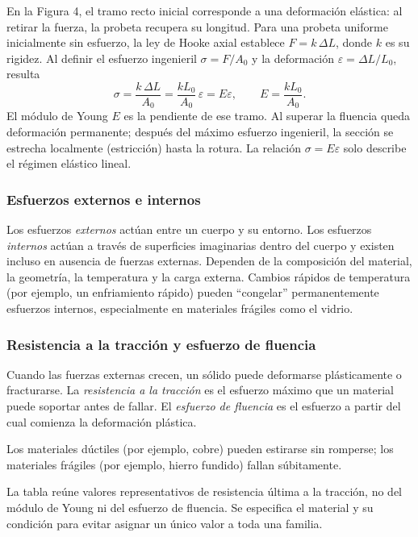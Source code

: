 En la Figura 4, el tramo recto inicial corresponde a una deformación elástica: al retirar la fuerza, la probeta recupera su longitud. Para una probeta uniforme inicialmente sin esfuerzo, la ley de Hooke axial establece $F=k\,\Delta L$, donde $k$ es su rigidez. Al definir el esfuerzo ingenieril $\sigma=F/A_0$ y la deformación $\varepsilon=\Delta L/L_0$, resulta
\[
\sigma=\frac{k\,\Delta L}{A_0}
=\frac{kL_0}{A_0}\,\varepsilon
=E\varepsilon,
\qquad E=\frac{kL_0}{A_0}.
\]
El módulo de Young $E$ es la pendiente de ese tramo. Al superar la fluencia queda deformación permanente; después del máximo esfuerzo ingenieril, la sección se estrecha localmente (estricción) hasta la rotura. La relación $\sigma=E\varepsilon$ solo describe el régimen elástico lineal.

\subsubsection{Esfuerzos externos e internos}

Los esfuerzos \emph{externos} actúan entre un cuerpo y su entorno. Los esfuerzos \emph{internos} actúan a través de superficies imaginarias dentro del cuerpo y existen incluso en ausencia de fuerzas externas. Dependen de la composición del material, la geometría, la temperatura y la carga externa. Cambios rápidos de temperatura (por ejemplo, un enfriamiento rápido) pueden ``congelar'' permanentemente esfuerzos internos, especialmente en materiales frágiles como el vidrio.

\subsubsection{Resistencia a la tracción y esfuerzo de fluencia}

Cuando las fuerzas externas crecen, un sólido puede deformarse plásticamente o fracturarse. La \emph{resistencia a la tracción} es el esfuerzo máximo que un material puede soportar antes de fallar. El \emph{esfuerzo de fluencia} es el esfuerzo a partir del cual comienza la deformación plástica.

Los materiales dúctiles (por ejemplo, cobre) pueden estirarse sin romperse; los materiales frágiles (por ejemplo, hierro fundido) fallan súbitamente.

La tabla reúne valores representativos de resistencia última a la tracción, no del módulo de Young ni del esfuerzo de fluencia. Se especifica el material y su condición para evitar asignar un único valor a toda una familia.

